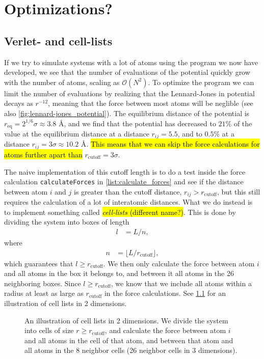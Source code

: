 \chapter{Optimizations?}
\section{Verlet- and cell-lists\label{sec:cell_lists}}
If we try to simulate systems with a lot of atoms using the program we now have developed, we see that the number of evaluations of the potential quickly grow with the number of atoms, scaling as $\mathcal{O}(N^2)$. To optimize the program we can limit the number of evaluations by realizing that the Lennard-Jones in potential decays as $r^{-12}$, meaning that the force between most atoms will be neglible (see also \cref{fig:lennard-jones_potential}). The equilibrium distance of the potential is $r_{\text{eq}} =  2^{1/6}\sigma \approx 3.8 \text{~\AA}$, and we find that the potential has decreased to $21\%$ of the value at the equilibrium distance at a distance $r_{ij} =  5.5$, and to $0.5\%$ at a distance $r_{ij} =  3\sigma \approx 10.2\text{~\AA}$. \hl{This means that we can skip the force calculations for atoms further apart than} $r_{\text{cutoff}} = 3\sigma$.

The naive implementation of this cutoff length is to do a test inside the force calculation \texttt{calculateForces} in \cref{list:calculate_forces} and see if the distance between atom $i$ and $j$ is greater than the cutoff distance, $r_{ij} > r_\text{cutoff}$, but this still requires the calculation of a lot of interatomic distances. What we do instead is to implement something called \hl{\emph{cell-lists} (different name?)}. This is done by dividing the system into boxes of length 
\begin{align*}
    l &= L/n,
\end{align*}
where
\begin{align*}
    n &= \lfloor  L/r_\text{cutoff} \rfloor,
\end{align*}
which guarantees that $l \geq r_\text{cutoff}$. We then only calculate the force between atom $i$ and all atoms in the box it belongs to, and between it all atoms in the 26 neighboring boxes. Since $l\geq r_\text{cutoff}$, we know that we include all atoms within a radius at least as large as $r_\text{cutoff}$ in the force calculations. See \cref{fig:cell_lists} for an illustration of cell lists in 2 dimensions.
\begin{figure}[htpb]%
    \centering%
    \caption{%
        An illustration of cell lists in 2 dimensions. We divide the system into cells of size $r \geq r_\text{cutoff}$, and calculate the force between atom $i$ and all atoms in the cell of that atom, and between that atom and all atoms in the 8 neighbor cells (26 neighbor cells in 3 dimensions). %
        \label{fig:cell_lists}%
    }%
\end{figure}%

